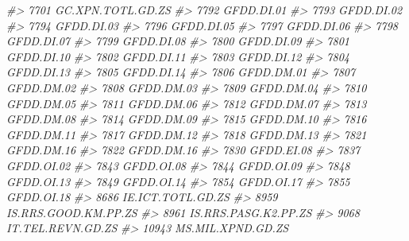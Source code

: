 \documentclass[
]{bxjsbook}
\newenvironment{Shaded}{\begin{snugshade}}{\end{snugshade}}
\newcommand{\CommentTok}[1]{\textcolor[rgb]{0.56,0.35,0.01}{\textit{#1}}}
\theoremstyle{definition}
\theoremstyle{definition}
\theoremstyle{definition}
\theoremstyle{definition}
\theoremstyle{remark}
\begin{document}
\begin{Shaded}
\begin{Highlighting}[]
\CommentTok{\#\textgreater{} 7701           GC.XPN.TOTL.GD.ZS}
\CommentTok{\#\textgreater{} 7792                  GFDD.DI.01}
\CommentTok{\#\textgreater{} 7793                  GFDD.DI.02}
\CommentTok{\#\textgreater{} 7794                  GFDD.DI.03}
\CommentTok{\#\textgreater{} 7796                  GFDD.DI.05}
\CommentTok{\#\textgreater{} 7797                  GFDD.DI.06}
\CommentTok{\#\textgreater{} 7798                  GFDD.DI.07}
\CommentTok{\#\textgreater{} 7799                  GFDD.DI.08}
\CommentTok{\#\textgreater{} 7800                  GFDD.DI.09}
\CommentTok{\#\textgreater{} 7801                  GFDD.DI.10}
\CommentTok{\#\textgreater{} 7802                  GFDD.DI.11}
\CommentTok{\#\textgreater{} 7803                  GFDD.DI.12}
\CommentTok{\#\textgreater{} 7804                  GFDD.DI.13}
\CommentTok{\#\textgreater{} 7805                  GFDD.DI.14}
\CommentTok{\#\textgreater{} 7806                  GFDD.DM.01}
\CommentTok{\#\textgreater{} 7807                  GFDD.DM.02}
\CommentTok{\#\textgreater{} 7808                  GFDD.DM.03}
\CommentTok{\#\textgreater{} 7809                  GFDD.DM.04}
\CommentTok{\#\textgreater{} 7810                  GFDD.DM.05}
\CommentTok{\#\textgreater{} 7811                  GFDD.DM.06}
\CommentTok{\#\textgreater{} 7812                  GFDD.DM.07}
\CommentTok{\#\textgreater{} 7813                  GFDD.DM.08}
\CommentTok{\#\textgreater{} 7814                  GFDD.DM.09}
\CommentTok{\#\textgreater{} 7815                  GFDD.DM.10}
\CommentTok{\#\textgreater{} 7816                  GFDD.DM.11}
\CommentTok{\#\textgreater{} 7817                  GFDD.DM.12}
\CommentTok{\#\textgreater{} 7818                  GFDD.DM.13}
\CommentTok{\#\textgreater{} 7821                  GFDD.DM.16}
\CommentTok{\#\textgreater{} 7822                  GFDD.DM.16}
\CommentTok{\#\textgreater{} 7830                  GFDD.EI.08}
\CommentTok{\#\textgreater{} 7837                  GFDD.OI.02}
\CommentTok{\#\textgreater{} 7843                  GFDD.OI.08}
\CommentTok{\#\textgreater{} 7844                  GFDD.OI.09}
\CommentTok{\#\textgreater{} 7848                  GFDD.OI.13}
\CommentTok{\#\textgreater{} 7849                  GFDD.OI.14}
\CommentTok{\#\textgreater{} 7854                  GFDD.OI.17}
\CommentTok{\#\textgreater{} 7855                  GFDD.OI.18}
\CommentTok{\#\textgreater{} 8686           IE.ICT.TOTL.GD.ZS}
\CommentTok{\#\textgreater{} 8959        IS.RRS.GOOD.KM.PP.ZS}
\CommentTok{\#\textgreater{} 8961        IS.RRS.PASG.K2.PP.ZS}
\CommentTok{\#\textgreater{} 9068           IT.TEL.REVN.GD.ZS}
\CommentTok{\#\textgreater{} 10943          MS.MIL.XPND.GD.ZS}

\end{Highlighting}
\end{Shaded}
\end{document}
